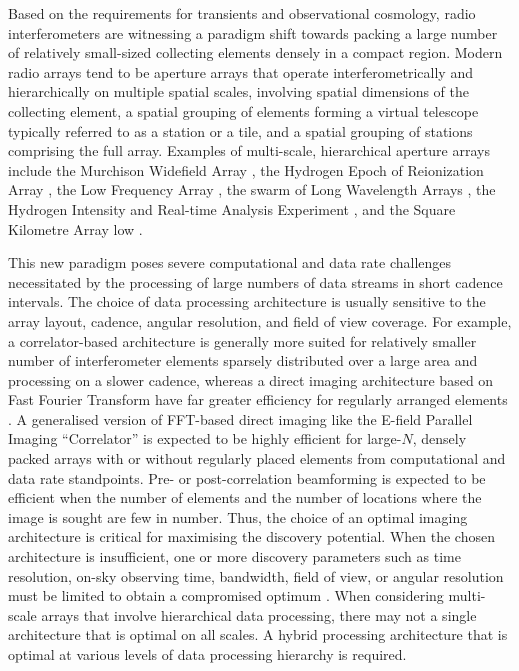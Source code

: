 \documentclass[
  journal=pasa,
  manuscript=article-type,
  year=2020,
  volume=37,
]{cup-journal}
\begin{document}
Based on the requirements for transients and observational cosmology, radio interferometers are witnessing a paradigm shift towards packing a large number of relatively small-sized collecting elements densely in a compact region. 
Modern radio arrays tend to be aperture arrays that operate interferometrically and hierarchically on multiple spatial scales, involving spatial dimensions of the collecting element, a spatial grouping of elements forming a virtual telescope typically referred to as a station or a tile, and a spatial grouping of stations comprising the full array.
Examples of multi-scale, hierarchical aperture arrays include the Murchison Widefield Array \cite[MWA;][]{Tingay+2013}, the Hydrogen Epoch of Reionization Array \citep[HERA;][]{HERA+2017}, the Low Frequency Array \cite[LOFAR;][]{vanHaarlem+2013}, the swarm of Long Wavelength Arrays \cite[LWA Swarm;][]{Dowell+2018}, 
the Hydrogen Intensity and Real-time Analysis Experiment \citep[HIRAX;][]{HIRAX+2022}, and the Square Kilometre Array low \cite[SKA-low;][]{Dewdney+2009,SKA1+2019}. 

This new paradigm poses severe computational and data rate challenges necessitated by the processing of large numbers of data streams in short cadence intervals. The choice of data processing architecture is usually sensitive to the array layout, cadence, angular resolution, and field of view coverage. For example, a correlator-based architecture is generally more suited for relatively smaller number of interferometer elements sparsely distributed over a large area and processing on a slower cadence, whereas a direct imaging architecture based on Fast Fourier Transform \citep[FFT;][]{Cooley+Tukey1965} have far greater efficiency for regularly arranged elements \citep{Daishido+1991,Otobe+1994,Tegmark+2009,Tegmark+2010,Foster+2014,Masui+2019}. A generalised version of FFT-based direct imaging like the E-field Parallel Imaging ``Correlator'' \citep[EPIC;][]{Thyagarajan+2017,Thyagarajan+2019,Krishnan+2023} is expected to be highly efficient for large-$N$, densely packed arrays with or without regularly placed elements from computational and data rate standpoints. Pre- or post-correlation beamforming is expected to be efficient when the number of elements and the number of locations where the image is sought are few in number. Thus, the choice of an optimal imaging architecture is critical for maximising the discovery potential. When the chosen architecture is insufficient, one or more discovery parameters such as time resolution, on-sky observing time, bandwidth, field of view, or angular resolution must be limited to obtain a compromised optimum \citep[for example,][]{Price2024}. When considering multi-scale arrays that involve hierarchical data processing, there may not a single architecture that is optimal on all scales. A hybrid processing architecture that is optimal at various levels of data processing hierarchy is required. 
\end{document}
